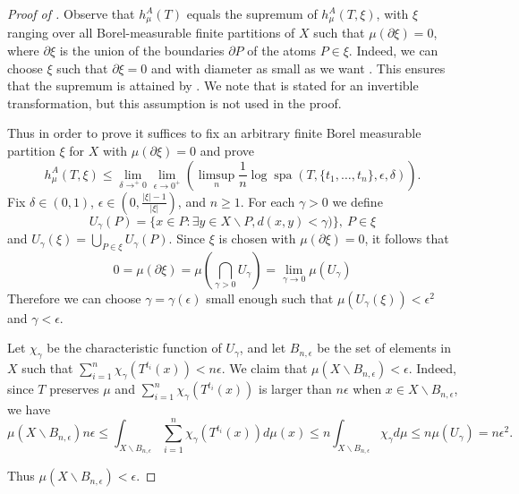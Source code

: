 \documentclass[a4paper,oneside]{amsart}
\renewcommand{\(}{\begin{dmath*}}
\renewcommand{\)}{\end{dmath*}}
\theoremstyle{definition}
\newcommand{\spa}{\operatorname{spa}}
\begin{document}
\begin{proof}[Proof of ]
    Observe that $h^{A}_{\mu}(T)$ equals the supremum of $h^{A}_{\mu}(T,\xi)$, with $\xi$ ranging over all Borel-measurable finite partitions of $X$ such that $\mu(\partial\xi)=0$, where $\partial \xi$ is the union of the boundaries $\partial P$ of the atoms  $P\in \xi$. Indeed, we can choose $\xi$ such that $\partial \xi=0$ and with diameter as small as we want \cite[Lemma 8.5]{walters_introduction_2000}. This ensures that the supremum is attained by \cite[Lemma 2]{kushnirenko_metric_1967}. We note that \cite[Lemma 2]{kushnirenko_metric_1967} is stated for an invertible transformation, but this assumption is not used in the proof. 
    
    Thus in order to  prove  it suffices to fix an arbitrary  finite Borel measurable partition $\xi$ for $X$ with $\mu(\partial \xi)=0$ and   prove  \begin{equation}\label{katok-v2-inequality-leq}
        h^{A}_{\mu}(T,\xi)\leq \lim_{\delta\to^+0}\lim_{\epsilon\to 0^+}\left(\limsup_n \frac{1}{n}\log \spa(T,\{t_1,\dots,t_n\},\epsilon,\delta)\right).
\end{equation} 
    Fix $\delta\in(0,1)$, $\epsilon\in (0,\frac{|\xi|-1}{|\xi|})$, and $n\geq 1$. For each $\gamma>0$ we define \[U_\gamma(P)=\{x\in P : \exists y\in X\smallsetminus P, d(x,y)<\gamma)\}, \ P\in \xi\]
    and $U_\gamma(\xi)=\bigcup_{P\in\xi}U_\gamma(P)$.
    Since $\xi$ is chosen with $\mu(\partial\xi)=0$, it follows that 
    \[
    0=\mu(\partial \xi)=\mu(\bigcap _{\gamma>0} U_{\gamma})=\lim_{\gamma\to 0}\mu(U_\gamma)\]
    Therefore we can choose $\gamma=\gamma(\epsilon)$ small enough such that  $\mu(U_\gamma(\xi))<\epsilon^2$ and $\gamma<\epsilon$.       
    
    Let $\chi_\gamma$ be the characteristic function of $U_\gamma$, and let $B_{n,\epsilon}$ be the set of elements in $X$ such that $\sum_{i=1}^n \chi_{\gamma}(T^{t_i}(x))<n\epsilon$. 
    We claim that  $\mu(X\smallsetminus B_{n,\epsilon})<\epsilon$. Indeed, since $T$ preserves $\mu$ and $\sum_{i=1}^n \chi_{\gamma}(T^{t_i}(x))$ is larger than $n\epsilon$ when $x\in X\smallsetminus B_{n,\epsilon}$, we have 
    \(\mu(X\smallsetminus B_{n,\epsilon}) n\epsilon  \leq \int_{X\smallsetminus B_{n,\epsilon}} \sum_{i=1}^n \chi_{\gamma}(T^{t_i}(x)) d\mu(x)
    \leq n \int_{X\smallsetminus B_{n,\epsilon}} \chi_{\gamma} d\mu
    \leq n \mu (U_{\gamma})=n\epsilon^2.\)
    
    Thus $\mu(X\smallsetminus B_{n,\epsilon})<\epsilon$.
    

\end{proof}
\end{document}
